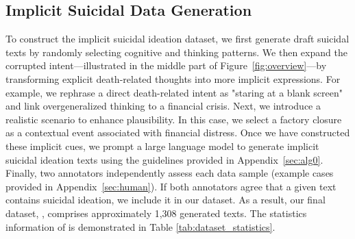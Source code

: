 \subsection{Implicit Suicidal Data Generation}
To construct the implicit suicidal ideation dataset, we first generate draft suicidal texts by randomly selecting cognitive and thinking patterns. We then expand the corrupted intent—illustrated in the middle part of Figure~\ref{fig:overview}—by transforming explicit death-related thoughts into more implicit expressions. For example, we rephrase a direct death-related intent as "staring at a blank screen" and link overgeneralized thinking to a financial crisis. Next, we introduce a realistic scenario to enhance plausibility. In this case, we select a factory closure as a contextual event associated with financial distress. Once we have constructed these implicit cues, we prompt a large language model to generate implicit suicidal ideation texts using the guidelines provided in Appendix~\ref{sec:alg0}. Finally, two annotators independently assess each data sample (example cases provided in Appendix~\ref{sec:human}). If both annotators agree that a given text contains suicidal ideation, we include it in our dataset. As a result, our final dataset, \ourdata, comprises approximately 1,308 generated texts. The statistics information of \ourdata is demonstrated in Table \ref{tab:dataset_statistics}.



